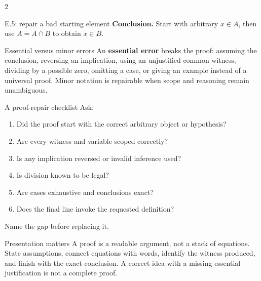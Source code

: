 \documentclass[10pt]{article}
\newcommand{\term}[1]{\textbf{\color{CoreNavy}#1}}
\begin{document}
\begin{multicols}{2}
\begin{workedbox}{E.5: repair a bad starting element}
\textbf{Conclusion.} Start with arbitrary $x\in A$, then use $A=A\cap B$ to obtain $x\in B$.
\end{workedbox}

\begin{definitionbox}{Essential versus minor errors}
An \term{essential error} breaks the proof: assuming the conclusion, reversing
an implication, using an unjustified common witness, dividing by a possible
zero, omitting a case, or giving an example instead of a universal proof.
Minor notation is repairable when scope and reasoning remain unambiguous.
\end{definitionbox}

\begin{methodbox}{A proof-repair checklist}
Ask:
\begin{enumerate}
\item Did the proof start with the correct arbitrary object or hypothesis?
\item Are every witness and variable scoped correctly?
\item Is any implication reversed or invalid inference used?
\item Is division known to be legal?
\item Are cases exhaustive and conclusions exact?
\item Does the final line invoke the requested definition?
\end{enumerate}
Name the gap before replacing it.
\end{methodbox}

\begin{warningbox}{Presentation matters}
A proof is a readable argument, not a stack of equations. State assumptions,
connect equations with words, identify the witness produced, and finish with
the exact conclusion. A correct idea with a missing essential justification is
not a complete proof.
\end{warningbox}

\end{multicols}
\end{document}
